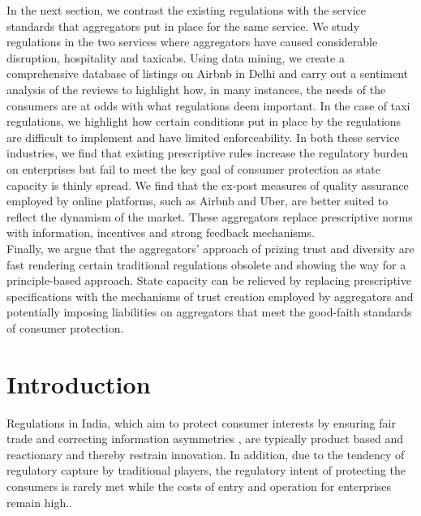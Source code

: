 \documentclass[a4paper, 12pt]{article}
\begin{document}
                  In the next section, we contrast the existing regulations with the service standards that aggregators put in place for the same service. We study regulations in the two services where aggregators have caused considerable disruption, hospitality and taxicabs. Using data mining, we create a comprehensive database of listings on Airbnb in Delhi and carry out a sentiment analysis of the reviews to highlight how, in many instances, the needs of the consumers are at odds with what regulations deem important. In the case of taxi regulations, we highlight how certain conditions put in place by the regulations are difficult to implement and have limited enforceability. In both these service industries, we find that existing prescriptive rules increase the regulatory burden on enterprises but fail to meet the key goal of consumer protection as state capacity is thinly spread. We find that the ex-post measures of quality assurance employed by online platforms, such as Airbnb and Uber, are better suited to reflect the dynamism of the market. These aggregators replace prescriptive norms with information, incentives and strong feedback mechanisms.    \\
                    
                 Finally, we argue that the aggregators' approach of prizing trust and diversity are fast rendering certain traditional regulations obsolete and showing the way for a principle-based approach. State capacity can be relieved by replacing prescriptive specifications with the mechanisms of trust creation employed by aggregators and potentially imposing liabilities on aggregators that meet the good-faith standards of consumer protection. \\

        
                    
            
                    \section{Introduction}
                 Regulations in India, which aim to protect consumer interests by ensuring fair trade and correcting information asymmetries \parencite{Dudely, Brito 2012, 11-14}, are typically product based and reactionary and thereby restrain innovation. In addition, due to the tendency of regulatory capture by traditional players, the regulatory intent of protecting the consumers is rarely met while the costs of entry and operation for enterprises remain high.. \\
                    
\end{document}
